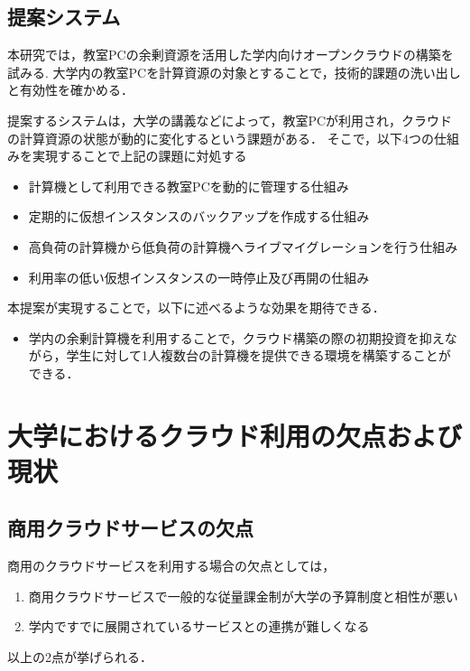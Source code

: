 \documentclass[10pt,a4paper]{jsarticle}
\begin{document}
\subsection{提案システム}
本研究では，教室PCの余剰資源を活用した学内向けオープンクラウドの構築を試みる.
大学内の教室PCを計算資源の対象とすることで，技術的課題の洗い出しと有効性を確かめる．
\par 提案するシステムは，大学の講義などによって，教室PCが利用され，クラウドの計算資源の状態が動的に変化するという課題がある．
そこで，以下4つの仕組みを実現することで上記の課題に対処する
\begin{itemize}
	\item 計算機として利用できる教室PCを動的に管理する仕組み
	\item 定期的に仮想インスタンスのバックアップを作成する仕組み
	\item 高負荷の計算機から低負荷の計算機へライブマイグレーションを行う仕組み
	\item 利用率の低い仮想インスタンスの一時停止及び再開の仕組み
\end{itemize}

\par 本提案が実現することで，以下に述べるような効果を期待できる．
\begin{itemize}
	\item 学内の余剰計算機を利用することで，クラウド構築の際の初期投資を抑えながら，学生に対して1人複数台の計算機を提供できる環境を構築することができる．
\end{itemize}


\section{大学におけるクラウド利用の欠点および現状}
\subsection{商用クラウドサービスの欠点}
商用のクラウドサービスを利用する場合の欠点としては，
\begin{enumerate}
	\item 商用クラウドサービスで一般的な従量課金制が大学の予算制度と相性が悪い
	\item 学内ですでに展開されているサービスとの連携が難しくなる
\end{enumerate}
以上の2点が挙げられる．
\end{document}
